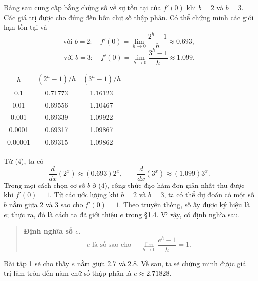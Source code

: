\documentclass[12pt,a4paper]{article}
\begin{document}
Bảng sau cung cấp bằng chứng số về sự tồn tại của $f'(0)$ khi $b=2$ và $b=3$. Các giá trị được cho đúng đến bốn chữ số thập phân. Có thể chứng minh các giới hạn tồn tại và
\[\text{với }b=2:\quad f'(0)=\lim_{h\to0}\frac{2^h-1}h\approx0.693,\]
\[\text{với }b=3:\quad f'(0)=\lim_{h\to0}\frac{3^h-1}h\approx1.099.\]
\begin{center}\begin{tabular}{ccc}\toprule
$h$ & $(2^h-1)/h$ & $(3^h-1)/h$\\\midrule
0.1&0.71773&1.16123\\
0.01&0.69556&1.10467\\
0.001&0.69339&1.09922\\
0.0001&0.69317&1.09867\\
0.00001&0.69315&1.09862\\\bottomrule
\end{tabular}\end{center}
Từ (4), ta có
\[\frac{d}{dx}(2^x)\approx(0.693)2^x,\qquad\frac{d}{dx}(3^x)\approx(1.099)3^x.\tag{5}\]
Trong mọi cách chọn cơ số $b$ ở (4), công thức đạo hàm đơn giản nhất thu được khi $f'(0)=1$. Từ các ước lượng khi $b=2$ và $b=3$, ta có thể dự đoán có một số $b$ nằm giữa 2 và 3 sao cho $f'(0)=1$. Theo truyền thống, số ấy được ký hiệu là $e$; thực ra, đó là cách ta đã giới thiệu $e$ trong §1.4. Vì vậy, có định nghĩa sau.
\begin{quote}\textbf{Định nghĩa số $e$.}
\[e\text{ là số sao cho }\quad\lim_{h\to0}\frac{e^h-1}h=1.\]
\end{quote}
Bài tập 1 sẽ cho thấy $e$ nằm giữa 2.7 và 2.8. Về sau, ta sẽ chứng minh được giá trị làm tròn đến năm chữ số thập phân là $e\approx2.71828$.
\end{document}
